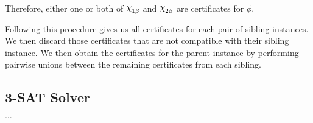 Therefore, either one or both of $\rchi_{1\beta}$ and $\rchi_{2\beta}$ are certificates for $\phi$.

Following this procedure gives us all certificates for each pair of sibling instances.
We then discard those certificates that are not compatible with their sibling instance.
We then obtain the certificates for the parent instance by performing pairwise unions between the remaining certificates from each sibling.


\subsection{3-SAT Solver}
\label{subsec:3-sat-solver}

$\dots$
